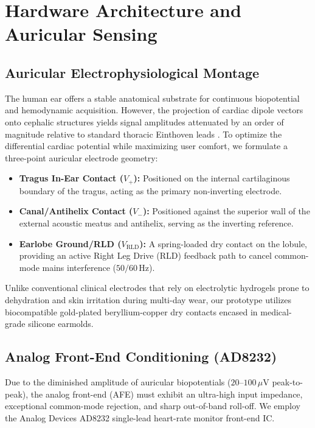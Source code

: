 \section{Hardware Architecture and Auricular Sensing}
\label{sec:hardware}

\subsection{Auricular Electrophysiological Montage}
The human ear offers a stable anatomical substrate for continuous biopotential and hemodynamic acquisition. However, the projection of cardiac dipole vectors onto cephalic structures yields signal amplitudes attenuated by an order of magnitude relative to standard thoracic Einthoven leads \cite{vonRosenberg2017}. To optimize the differential cardiac potential while maximizing user comfort, we formulate a three-point auricular electrode geometry:
\begin{itemize}
    \item \textbf{Tragus In-Ear Contact ($V_+$):} Positioned on the internal cartilaginous boundary of the tragus, acting as the primary non-inverting electrode.
    \item \textbf{Canal/Antihelix Contact ($V_-$):} Positioned against the superior wall of the external acoustic meatus and antihelix, serving as the inverting reference.
    \item \textbf{Earlobe Ground/RLD ($V_{\text{RLD}}$):} A spring-loaded dry contact on the lobule, providing an active Right Leg Drive (RLD) feedback path to cancel common-mode mains interference ($50/60$\,Hz).
\end{itemize}

Unlike conventional clinical electrodes that rely on electrolytic hydrogels prone to dehydration and skin irritation during multi-day wear, our prototype utilizes biocompatible gold-plated beryllium-copper dry contacts encased in medical-grade silicone earmolds.

\subsection{Analog Front-End Conditioning (AD8232)}
Due to the diminished amplitude of auricular biopotentials ($20$--$100\,\mu\text{V}$ peak-to-peak), the analog front-end (AFE) must exhibit an ultra-high input impedance, exceptional common-mode rejection, and sharp out-of-band roll-off. We employ the Analog Devices AD8232 single-lead heart-rate monitor front-end IC. 

